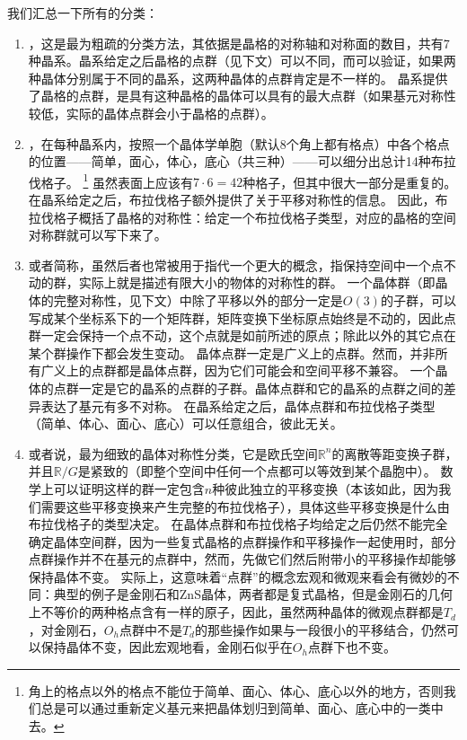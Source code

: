 我们汇总一下所有的分类：
\begin{enumerate}
    \item {}，这是最为粗疏的分类方法，其依据是晶格的对称轴和对称面的数目，共有7种晶系。晶系给定之后晶格的点群（见下文）可以不同，而可以验证，如果两种晶体分别属于不同的晶系，这两种晶体的点群肯定是不一样的。
    晶系提供了晶格的点群，是具有这种晶格的晶体可以具有的最大点群（如果基元对称性较低，实际的晶体点群会小于晶格的点群）。
    \item {}，在每种晶系内，按照一个晶体学单胞（默认8个角上都有格点）中各个格点的位置——简单，面心，体心，底心（共三种）——可以细分出总计14种布拉伐格子。%
    \footnote{
        角上的格点以外的格点不能位于简单、面心、体心、底心以外的地方，否则我们总是可以通过重新定义基元来把晶体划归到简单、面心、底心中的一类中去。
    }%
    虽然表面上应该有$7 \cdot 6 = 42$种格子，但其中很大一部分是重复的。
    在晶系给定之后，布拉伐格子额外提供了关于平移对称性的信息。
    因此，布拉伐格子概括了晶格的对称性：给定一个布拉伐格子类型，对应的晶格的空间对称群就可以写下来了。
    \item {}或者简称，虽然后者也常被用于指代一个更大的概念，指保持空间中一个点不动的群，实际上就是描述有限大小的物体的对称性的群。
    一个晶体群（即晶体的完整对称性，见下文）中除了平移以外的部分一定是$O(3)$的子群，可以写成某个坐标系下的一个矩阵群，矩阵变换下坐标原点始终是不动的，因此点群一定会保持一个点不动，这个点就是如前所述的原点；除此以外的其它点在某个群操作下都会发生变动。
    晶体点群一定是广义上的点群。然而，并非所有广义上的点群都是晶体点群，因为它们可能会和空间平移不兼容。
    一个晶体的点群一定是它的晶系的点群的子群。晶体点群和它的晶系的点群之间的差异表达了基元有多不对称。
    在晶系给定之后，晶体点群和布拉伐格子类型（简单、体心、面心、底心）可以任意组合，彼此无关。
    \item {}或者说，最为细致的晶体对称性分类，它是欧氏空间$\mathbb{R}^n$的离散等距变换子群，并且$\mathbb{R} / G$是紧致的（即整个空间中任何一个点都可以等效到某个晶胞中）。
    数学上可以证明这样的群一定包含$n$种彼此独立的平移变换（本该如此，因为我们需要这些平移变换来产生完整的布拉伐格子），具体这些平移变换是什么由布拉伐格子的类型决定。
    在晶体点群和布拉伐格子均给定之后仍然不能完全确定晶体空间群，因为一些复式晶格的点群操作和平移操作一起使用时，部分点群操作并不在基元的点群中，然而，先做它们然后附带小的平移操作却能够保持晶体不变。
    实际上，这意味着“点群”的概念宏观和微观来看会有微妙的不同：典型的例子是金刚石和ZnS晶体，两者都是复式晶格，但是金刚石的几何上不等价的两种格点含有一样的原子，因此，虽然两种晶体的微观点群都是$T_d$，对金刚石，$O_h$点群中不是$T_d$的那些操作如果与一段很小的平移结合，仍然可以保持晶体不变，因此宏观地看，金刚石似乎在$O_h$点群下也不变。
\end{enumerate}

